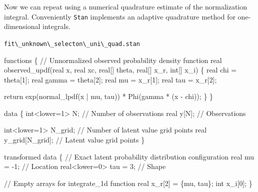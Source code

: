 \documentclass[
  letterpaper,
  DIV=11,
  numbers=noendperiod]{scrartcl}
\newenvironment{Shaded}{\begin{snugshade}}{\end{snugshade}}
\newcommand{\CommentTok}[1]{\textcolor[rgb]{0.37,0.37,0.37}{#1}}
\newcommand{\ControlFlowTok}[1]{\textcolor[rgb]{0.00,0.23,0.31}{#1}}
\newcommand{\DataTypeTok}[1]{\textcolor[rgb]{0.68,0.00,0.00}{#1}}
\newcommand{\DecValTok}[1]{\textcolor[rgb]{0.68,0.00,0.00}{#1}}
\newcommand{\KeywordTok}[1]{\textcolor[rgb]{0.00,0.23,0.31}{#1}}
\newcommand{\NormalTok}[1]{\textcolor[rgb]{0.00,0.23,0.31}{#1}}
\begin{document}
Now we can repeat using a numerical quadrature estimate of the
normalization integral. Conveniently \texttt{Stan} implements an
adaptive quadrature method for one-dimensional integrals.

\begin{codelisting}

\caption{\texttt{fit\textbackslash\_unknown\textbackslash\_selecton\textbackslash\_uni\textbackslash\_quad.stan}}

\begin{Shaded}
\begin{Highlighting}[]
\KeywordTok{functions}\NormalTok{ \{}
  \CommentTok{// Unnormalized observed probability density function}
  \DataTypeTok{real}\NormalTok{ observed\_updf(}\DataTypeTok{real}\NormalTok{ x, }\DataTypeTok{real}\NormalTok{ xc, }\DataTypeTok{real}\NormalTok{[] theta, }\DataTypeTok{real}\NormalTok{[] x\_r, }\DataTypeTok{int}\NormalTok{[] x\_i) \{}
    \DataTypeTok{real}\NormalTok{ chi = theta[}\DecValTok{1}\NormalTok{];}
    \DataTypeTok{real}\NormalTok{ gamma = theta[}\DecValTok{2}\NormalTok{];}
    \DataTypeTok{real}\NormalTok{ mu = x\_r[}\DecValTok{1}\NormalTok{];}
    \DataTypeTok{real}\NormalTok{ tau = x\_r[}\DecValTok{2}\NormalTok{];}
    
    \ControlFlowTok{return}\NormalTok{ exp(normal\_lpdf(x | mu, tau)) * Phi(gamma * (x {-} chi));}
\NormalTok{  \}}
\NormalTok{\}}

\KeywordTok{data}\NormalTok{ \{}
  \DataTypeTok{int}\NormalTok{\textless{}}\KeywordTok{lower}\NormalTok{=}\DecValTok{1}\NormalTok{\textgreater{} N; }\CommentTok{// Number of observations}
  \DataTypeTok{real}\NormalTok{ y[N];      }\CommentTok{// Observations}

  \DataTypeTok{int}\NormalTok{\textless{}}\KeywordTok{lower}\NormalTok{=}\DecValTok{1}\NormalTok{\textgreater{} N\_grid; }\CommentTok{// Number of latent value grid points}
  \DataTypeTok{real}\NormalTok{ y\_grid[N\_grid]; }\CommentTok{// Latent value grid points}
\NormalTok{\}}

\KeywordTok{transformed data}\NormalTok{ \{}
  \CommentTok{// Exact latent probability distribution configuration}
  \DataTypeTok{real}\NormalTok{ mu = {-}}\DecValTok{1}\NormalTok{;          }\CommentTok{// Location}
  \DataTypeTok{real}\NormalTok{\textless{}}\KeywordTok{lower}\NormalTok{=}\DecValTok{0}\NormalTok{\textgreater{} tau = }\DecValTok{3}\NormalTok{; }\CommentTok{// Shape}
  
  \CommentTok{// Empty arrays for \textasciigrave{}integrate\_1d\textasciigrave{} function}
  \DataTypeTok{real}\NormalTok{ x\_r[}\DecValTok{2}\NormalTok{] = \{mu, tau\};}
  \DataTypeTok{int}\NormalTok{ x\_i[}\DecValTok{0}\NormalTok{];}
\NormalTok{\}}


\end{Highlighting}
\end{Shaded}
\end{codelisting}
\end{document}
